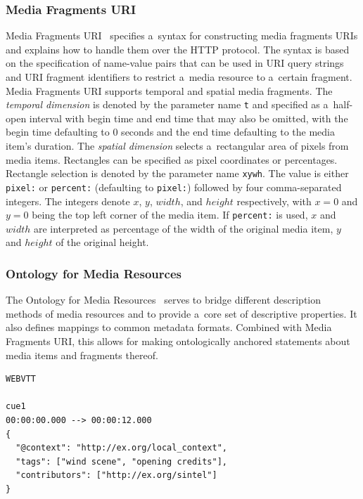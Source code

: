 \documentclass[runningheads,a4paper]{llncs}
\begin{document}
\subsubsection{Media Fragments URI}

Media Fragments URI~\cite{troncy2012mediafragments}
specifies a~syntax for constructing media fragments URIs
and explains how to handle them over the HTTP protocol.
The syntax is based on the specification of
name-value pairs that can be used in URI query strings
and URI fragment identifiers to restrict a~media resource
to a~certain fragment.
Media Fragments URI supports temporal and spatial media fragments.
The \emph{temporal dimension} is denoted
by the parameter name \texttt{t} and specified
as a~half-open interval with begin time and end time
that may also be omitted,
with the begin time defaulting to 0 seconds
and the end time defaulting to the media item's duration.
The \emph{spatial dimension} selects
a~rectangular area of pixels from media items.
Rectangles can be specified as pixel coordinates or percentages.
Rectangle selection is denoted by the parameter name \texttt{xywh}.
The value is either \texttt{pixel:} or \texttt{percent:}
(defaulting to \texttt{pixel:})
followed by four comma-separated integers.
The integers denote $x$, $y$, $width$, and $height$ respectively,
with $x = 0$ and $y = 0$ being the top left corner of the media item.
If \texttt{percent:} is used, $x$ and $width$ are interpreted
as percentage of the width of the original media item,
$y$ and $height$
of the original height.

\subsubsection{Ontology for Media Resources}

The Ontology for Media Resources~\cite{lee2012mediaontology}
serves to bridge different description methods of media resources
and to provide a~core set of descriptive properties.
It also defines mappings to common metadata formats.
Combined with Media Fragments URI,
this allows for making ontologically anchored statements
about media items and fragments thereof.

\begin{lstlisting}[caption={Sample WebVTT metadata file},
  label=listing:webvtt, float=t!]
WEBVTT

cue1
00:00:00.000 --> 00:00:12.000
{
  "@context": "http://ex.org/local_context",
  "tags": ["wind scene", "opening credits"],
  "contributors": ["http://ex.org/sintel"]
}
\end{lstlisting}
\end{document}

